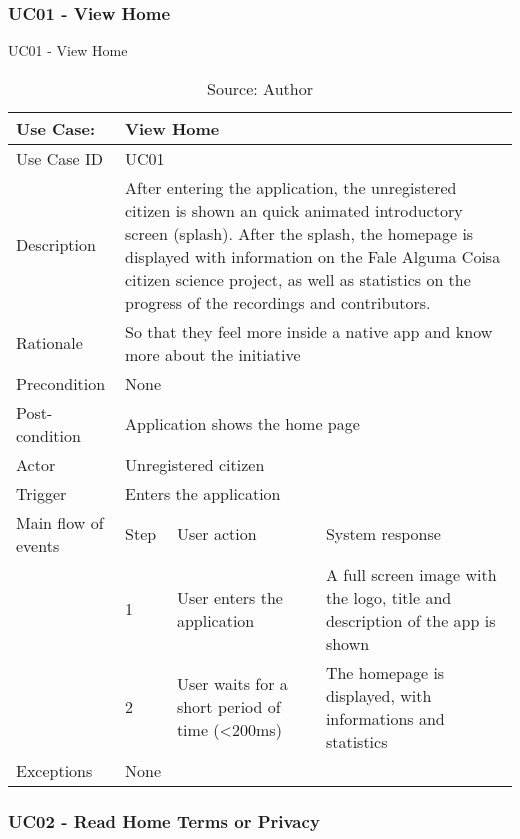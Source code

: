 \subsubsection{UC01 - View Home}

\begin{table}[h]
\centering
\caption{UC01 - View Home}
\label{uc:01}
\begin{tabular}{|p{3cm}|p{1cm}|p{5cm}|p{5cm}|}
\hline
Use Case:       & \multicolumn{3}{p{11cm}|}{View Home} \\ \hline
Use Case ID     & \multicolumn{3}{p{11cm}|}{UC01} \\ \hline
Description     & \multicolumn{3}{p{11cm}|}{After entering the application, the unregistered citizen is shown an quick animated introductory screen (splash). After the splash, the homepage is displayed with information on the Fale Alguma Coisa citizen science project, as well as statistics on the progress of the recordings and contributors.} \\ \hline
Rationale       & \multicolumn{3}{p{11cm}|}{So that they feel more inside a native app and know more about the initiative} \\ \hline
Precondition    & \multicolumn{3}{p{11cm}|}{None} \\ \hline
Post-condition  & \multicolumn{3}{p{11cm}|}{Application shows the home page} \\ \hline
Actor           & \multicolumn{3}{p{11cm}|}{Unregistered citizen} \\ \hline
Trigger         & \multicolumn{3}{p{11cm}|}{Enters the application} \\ \hline
Main flow of events & Step  & User action & System response \\ \hline
                    & 1     & User enters the application & A full screen image with the logo, title and description of the app is shown \\ \hline
                    & 2     & User waits for a short period of time (<200ms) & The homepage is displayed, with informations and statistics \\ \hline
Exceptions      & \multicolumn{3}{p{11cm}|}{None} \\ \hline
\end{tabular}
\caption*{Source: Author}
\end{table}

\subsubsection{UC02 - Read Home Terms or Privacy}

